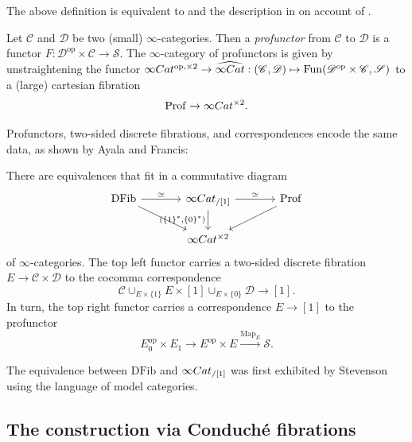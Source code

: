 \documentclass[a4paper, 11pt]{amsart}
\numberwithin{theorem}{section}
\theoremstyle{definition}
\newcommand{\cat}[1]{\textup{#1}}
\newcommand{\op}{\mathrm{op}}
\newcommand{\map}{\mathrm{Map}}
\newcommand{\fun}{\mathrm{Fun}}
\newcommand{\Cat}{\cat{Cat}}
\renewcommand{\S}{\mathscr{S}}
\newcommand{\C}{\mathscr{C}}
\renewcommand{\D}{\mathscr{D}}
\newcommand{\DFib}{\mathrm{DFib}}
\newcommand{\prof}{\mathrm{Prof}}
\begin{document}
\begin{remark}
	The above definition is equivalent to \cite[Definition 2.4.7.2]{HTT} and the description in \cite[Subsection 4.1]{AyalaFrancis} on account of \cite[Proposition 2.3.13]{HHLN}.
\end{remark}

\begin{definition}
	Let $\C$ and $\D$ be two (small) $\infty$-categories. Then a \textit{profunctor} from $\C$ to $\D$ is a functor 
	$
   F : \D^\op\times \C \rightarrow \S.
   $
   The $\infty$-category of profunctors is given by unstraightening the functor
$
\infty\Cat^{\op, \times 2} \rightarrow \widehat{\infty\Cat} : (\C, \D) \mapsto \fun(\D^\op \times \C, \S)
$
to a (large) cartesian fibration 
$$
\prof \rightarrow \infty\Cat^{\times 2}.
$$
\end{definition}

Profunctors, two-sided discrete fibrations, and correspondences encode the same data, as shown by Ayala and Francis:

\begin{proposition}\label{prop.equiv-cor-bifib-prof}
	There are equivalences that fit in a commutative diagram
	\[ 
	\begin{tikzcd}[column sep = large]
		\DFib \arrow[r, "\simeq"]\arrow[dr]& \infty\Cat_{/[1]} \arrow[r,"\simeq"]\arrow[d, "{(\{1\}^*, \{0\}^*)}"'] & \prof \arrow[dl] \\
		& \infty\Cat^{\times 2}
	\end{tikzcd}
	\]
	of $\infty$-categories. 
	The top left functor carries a two-sided discrete fibration $E \rightarrow \C\times \D$ 
	to the cocomma correspondence $$\C  \cup_{E \times \{1\}} E \times [1] \cup_{E \times \{0\}} \D \rightarrow [1].$$
	In turn, the top right functor carries a correspondence $E \rightarrow [1]$ to the profunctor 
	$$
	E_0^\op \times E_1 \rightarrow E^\op \times E \xrightarrow{\map_E} \S. 
	$$
\end{proposition}

\begin{remark}
The equivalence between $\DFib$ and $\infty\Cat_{/[1]}$
was first exhibited by Stevenson \cite{Stevenson} using 
the language of model categories.
\end{remark}

\subsection{The construction via Conduch\'e fibrations} 
\end{document}
